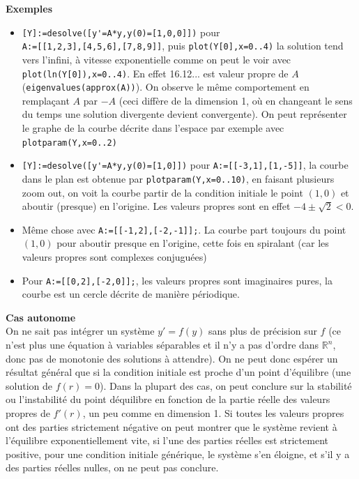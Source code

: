 \documentclass[a4paper,11pt]{article}
\newcommand{\R}{{\mathbb{R}}}
\begin{document}
\begin{giacjshere}
{\bf Exemples }
\begin{itemize}
\item
\verb|[Y]:=desolve([y'=A*y,y(0)=[1,0,0]])| pour\\
\verb|A:=[[1,2,3],[4,5,6],[7,8,9]]|, 
puis \verb|plot(Y[0],x=0..4)| la solution tend vers l'infini,
\`a vitesse exponentielle comme on peut
le voir avec \verb|plot(ln(Y[0]),x=0..4)|.
En effet 16.12... est valeur propre de $A$
(\verb|eigenvalues(approx(A))|). On observe le m\^eme
comportement en rempla\c{c}ant $A$ par $-A$ (ceci
diff\`ere de la dimension 1, o\`u en changeant le sens
du temps une solution divergente devient convergente).
On peut repr\'esenter le graphe de la courbe d\'ecrite
dans l'espace par exemple avec \verb|plotparam(Y,x=0..2)|
\item \verb|[Y]:=desolve([y'=A*y,y(0)=[1,0]])| pour 
\verb|A:=[[-3,1],[1,-5]]|, la courbe dans le plan est
obtenue par \verb|plotparam(Y,x=0..10)|, en faisant
plusieurs zoom out, on voit la courbe partir de la condition
initiale le point $(1,0)$ et aboutir (presque) en l'origine.
Les valeurs propres sont en effet $-4\pm \sqrt{2}<0$.
\item M\^eme chose avec \verb|A:=[[-1,2],[-2,-1]];|.
La courbe part toujours du point $(1,0)$ pour
aboutir presque en l'origine, cette fois en spiralant
(car les valeurs propres sont complexes conjugu\'ees)
\item Pour \verb|A:=[[0,2],[-2,0]];|, les valeurs
propres sont imaginaires pures, la courbe est un cercle
d\'ecrite de mani\`ere p\'eriodique.
\end{itemize}

{\bf Cas autonome}\\
On ne sait pas int\'egrer un syst\`eme $y'=f(y)$ sans plus
de pr\'ecision sur $f$ (ce n'est plus une \'equation \`a
variables s\'eparables et il n'y a pas d'ordre dans $\R^n$,
donc pas de monotonie des solutions \`a attendre).
On ne peut donc
esp\'erer un r\'esultat g\'en\'eral que si la condition initiale 
est proche d'un point d'\'equilibre (une solution de $f(r)=0$).
Dans la plupart des cas, on peut conclure sur la stabilit\'e
ou l'instabilit\'e du point d\'equilibre en fonction de la partie
r\'eelle des valeurs propres de $f'(r)$, un peu comme en dimension 1.
Si toutes les valeurs propres ont des parties strictement n\'egative
on peut montrer que
le syst\`eme revient \`a l'\'equilibre exponentiellement vite, si
l'une des parties r\'eelles est strictement positive,
pour une condition initiale g\'en\'erique, le syst\`eme s'en
\'eloigne, et s'il y a des parties r\'eelles nulles, on ne peut pas
conclure.


\end{giacjshere}
\end{document}
